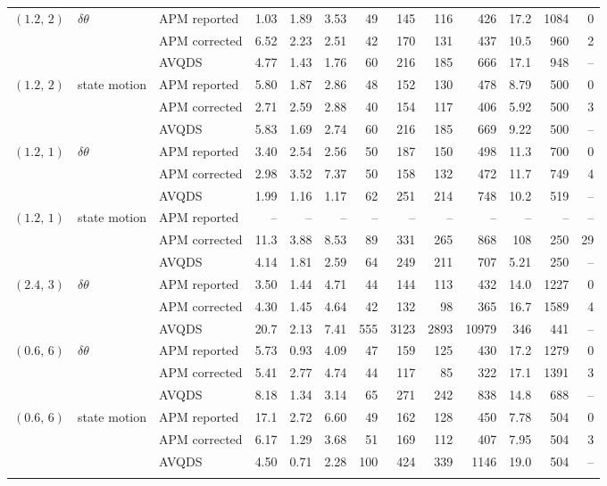 \documentclass[10pt]{article}
\begin{document}
\begin{table}[H]
\begin{tabular}{lllrrrrrrrrrr}
\addlinespace[2pt]
$(1.2,\,2)$ & $\delta\theta$ & APM reported & 1.03 & 1.89 & 3.53 & 49 & 145 & 116 & 426 & 17.2 & 1084 & 0 \\
 &  & APM corrected & 6.52 & 2.23 & 2.51 & 42 & 170 & 131 & 437 & 10.5 & 960 & 2 \\
 &  & AVQDS & 4.77 & 1.43 & 1.76 & 60 & 216 & 185 & 666 & 17.1 & 948 & -- \\
\addlinespace[2pt]
$(1.2,\,2)$ & state motion & APM reported & 5.80 & 1.87 & 2.86 & 48 & 152 & 130 & 478 & 8.79 & 500 & 0 \\
 &  & APM corrected & 2.71 & 2.59 & 2.88 & 40 & 154 & 117 & 406 & 5.92 & 500 & 3 \\
 &  & AVQDS & 5.83 & 1.69 & 2.74 & 60 & 216 & 185 & 669 & 9.22 & 500 & -- \\
\addlinespace[2pt]
$(1.2,\,1)$ & $\delta\theta$ & APM reported & 3.40 & 2.54 & 2.56 & 50 & 187 & 150 & 498 & 11.3 & 700 & 0 \\
 &  & APM corrected & 2.98 & 3.52 & 7.37 & 50 & 158 & 132 & 472 & 11.7 & 749 & 4 \\
 &  & AVQDS & 1.99 & 1.16 & 1.17 & 62 & 251 & 214 & 748 & 10.2 & 519 & -- \\
\addlinespace[2pt]
$(1.2,\,1)$ & state motion & APM reported & -- & -- & -- & -- & -- & -- & -- & -- & -- & -- \\
 &  & APM corrected & 11.3 & 3.88 & 8.53 & 89 & 331 & 265 & 868 & 108 & 250 & 29 \\
 &  & AVQDS & 4.14 & 1.81 & 2.59 & 64 & 249 & 211 & 707 & 5.21 & 250 & -- \\
\addlinespace[2pt]
$(2.4,\,3)$ & $\delta\theta$ & APM reported & 3.50 & 1.44 & 4.71 & 44 & 144 & 113 & 432 & 14.0 & 1227 & 0 \\
 &  & APM corrected & 4.30 & 1.45 & 4.64 & 42 & 132 & 98 & 365 & 16.7 & 1589 & 4 \\
 &  & AVQDS & 20.7 & 2.13 & 7.41 & 555 & 3123 & 2893 & 10979 & 346 & 441 & -- \\
\addlinespace[2pt]
$(0.6,\,6)$ & $\delta\theta$ & APM reported & 5.73 & 0.93 & 4.09 & 47 & 159 & 125 & 430 & 17.2 & 1279 & 0 \\
 &  & APM corrected & 5.41 & 2.77 & 4.74 & 44 & 117 & 85 & 322 & 17.1 & 1391 & 3 \\
 &  & AVQDS & 8.18 & 1.34 & 3.14 & 65 & 271 & 242 & 838 & 14.8 & 688 & -- \\
\addlinespace[2pt]
$(0.6,\,6)$ & state motion & APM reported & 17.1 & 2.72 & 6.60 & 49 & 162 & 128 & 450 & 7.78 & 504 & 0 \\
 &  & APM corrected & 6.17 & 1.29 & 3.68 & 51 & 169 & 112 & 407 & 7.95 & 504 & 3 \\
 &  & AVQDS & 4.50 & 0.71 & 2.28 & 100 & 424 & 339 & 1146 & 19.0 & 504 & -- \\
\addlinespace[2pt]
\bottomrule\end{tabular}\end{table}
\end{document}
